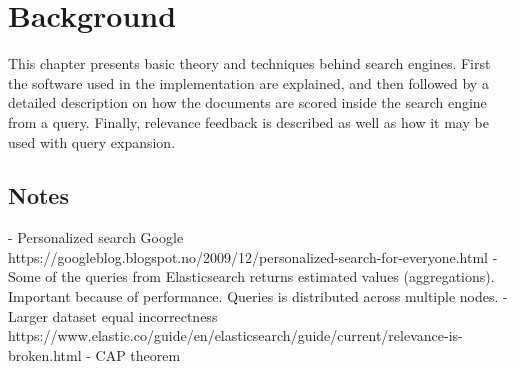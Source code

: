 \chapter{Background}
\label{ch:background}
This chapter presents basic theory and techniques behind search engines. First
the software used in the implementation are explained, and then followed by a
detailed description on how the documents are scored inside the search engine from a
query. Finally, relevance feedback is described as well as how it may be used with query
expansion.






%



\section{Notes}
- Personalized search Google https://googleblog.blogspot.no/2009/12/personalized-search-for-everyone.html
- Some of the queries from Elasticsearch returns estimated values (aggregations). Important because of performance. Queries is distributed across multiple nodes.
- Larger dataset equal incorrectness https://www.elastic.co/guide/en/elasticsearch/guide/current/relevance-is-broken.html
- CAP theorem %

